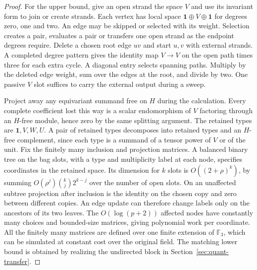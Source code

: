 \documentclass[11pt]{article}
\theoremstyle{definition}
\begin{document}
\begin{proof}
For the upper bound, give an open strand the space \(V\) and use its invariant form to join or create strands. Each vertex has local space \(\mathbf1\oplus V\oplus\mathbf1\) for degrees zero, one and two. An edge may be skipped or selected with its weight. Selection creates a pair, evaluates a pair or transfers one open strand as the endpoint degrees require. Delete a chosen root edge \(uv\) and start \(u,v\) with external strands. A completed degree pattern gives the identity map \(V\to V\) on the open path times three for each extra cycle. A diagonal entry selects spanning paths. Multiply by the deleted edge weight, sum over the edges at the root, and divide by two. One passive \(V\) slot suffices to carry the external output during a sweep.

Project away any equivariant summand free on \(H\) during the calculation. Every complete coefficient lost this way is a scalar endomorphism of \(V\) factoring through an \(H\)-free module, hence zero by the same splitting argument. The retained types are \(\mathbf1,V,W,U\). A pair of retained types decomposes into retained types and an \(H\)-free complement, since each type is a summand of a tensor power of \(V\) or of the unit. Fix the finitely many inclusion and projection matrices. A balanced binary tree on the bag slots, with a type and multiplicity label at each node, specifies coordinates in the retained space. Its dimension for \(k\) slots is \(O((2+\rho)^k)\), by summing \(O(\rho^j)\binom kj2^{k-j}\) over the number of open slots. On an unaffected subtree projection after inclusion is the identity on the chosen copy and zero between different copies. An edge update can therefore change labels only on the ancestors of its two leaves. The \(O(\log(p+2))\) affected nodes have constantly many choices and bounded-size matrices, giving polynomial work per coordinate. All the finitely many matrices are defined over one finite extension of \(\mathbb F_3\), which can be simulated at constant cost over the original field. The matching lower bound is obtained by realizing the undirected block in Section~\ref{sec:quant-transfer}.
\end{proof}
\end{document}
